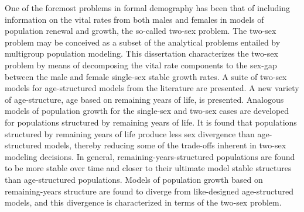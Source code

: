 
One of the foremost problems in formal demography has been that of including
information on the vital rates from both males and females in models of
population renewal and growth, the so-called two-sex problem. The two-sex
problem may be conceived as a subset of the analytical problems entailed by
multigroup population modeling. This dissertation characterizes the two-sex 
problem by means of decomposing the vital 
rate components to the sex-gap between the male and female single-sex stable growth
rates. A suite of two-sex models for age-structured models from the
literature are presented. A new variety of age-structure, age based on remaining
years of life, is presented. Analogous models of population growth for the
single-sex and two-sex cases are developed for populations structured by
remaining years of life. It is found that populations structured by remaining
years of life produce less sex divergence than age-structured models,
thereby reducing some of the trade-offs inherent in two-sex modeling decisions.
In general, remaining-years-structured populations are found to be more stable
over time and closer to their ultimate model stable structures than
age-structured populations. Models of population growth based on remaining-years 
structure are found to diverge from
like-designed age-structured models, and this divergence is characterized in
terms of the two-sex problem.
